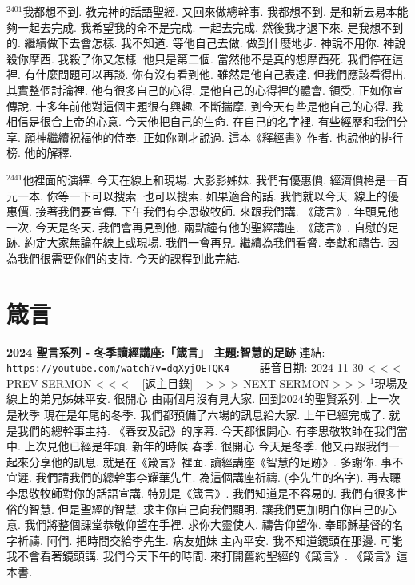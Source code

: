 \documentclass{book}
\begin{document}
$^{2401}$我都想不到.
教完神的話語聖經.
又回來做總幹事.
我都想不到.
是和新去易本能夠一起去完成.
我希望我的命不是完成.
一起去完成.
然後我才退下來.
是我想不到的.
繼續做下去會怎樣.
我不知道.
等他自己去做.
做到什麼地步.
神說不用你.
神說殺你摩西.
我殺了你又怎樣.
他只是第二個.
當然他不是真的想摩西死.
我們停在這裡.
有什麼問題可以再談.
你有沒有看到他.
雖然是他自己表達.
但我們應該看得出.
其實整個討論裡.
他有很多自己的心得.
是他自己的心得裡的體會.
領受.
正如你宣傳說.
十多年前他對這個主題很有興趣.
不斷揣摩.
到今天有些是他自己的心得.
我相信是很合上帝的心意.
今天他把自己的生命.
在自己的名字裡.
有些經歷和我們分享.
願神繼續祝福他的侍奉.
正如你剛才說過.
這本《釋經書》作者.
也說他的排行榜.
他的解釋.

$^{2441}$他裡面的演繹.
今天在線上和現場.
大影影姊妹.
我們有優惠價.
經濟價格是一百元一本.
你等一下可以搜索.
也可以搜索.
如果適合的話.
我們就以今天.
線上的優惠價.
接著我們要宣傳.
下午我們有李思敬牧師.
來跟我們講.
《箴言》.
年頭見他一次.
今天是冬天.
我們會再見到他.
兩點鐘有他的聖經講座.
《箴言》.
自慰的足跡.
約定大家無論在線上或現場.
我們一會再見.
繼續為我們看脅.
奉獻和禱告.
因為我們很需要你們的支持.
今天的課程到此完結.
\newpage



\section{箴言}
\label{sec:dqXyjOETQK4}
\textbf{2024 聖言系列 - 冬季讀經講座:「箴言」 主題:智慧的足跡}
\newline
\newline
連結: \href{https://youtube.com/watch?v=dqXyjOETQK4}{\texttt{https://youtube.com/watch?v=dqXyjOETQK4}} ~~~~ 語音日期: 2024-11-30
\newline
\newline
\hyperref[sec:m4SkjH3Fp_4]{\small{< < < PREV SERMON < < <}}
~
\hyperref[sec:index]{\small{[返主目錄]}}
~
\hyperref[sec:EZL_OCl_lJE]{\small{> > > NEXT SERMON > > >}}
\newline
\newline
$^{1}$現場及線上的弟兄姊妹平安.
很開心 由兩個月沒有見大家.
回到2024的聖賢系列.
上一次是秋季 現在是年尾的冬季.
我們都預備了六場的訊息給大家.
上午已經完成了.
就是我們的總幹事主持.
《春安及記》的序幕.
今天都很開心.
有李思敬牧師在我們當中.
上次見他已經是年頭.
新年的時候 春季.
很開心 今天是冬季.
他又再跟我們一起來分享他的訊息.
就是在《箴言》裡面.
讀經講座《智慧的足跡》.
多謝你.
事不宜遲.
我們請我們的總幹事李耀華先生.
為這個講座祈禱.
(李先生的名字).
再去聽李思敬牧師對你的話語宣講.
特別是《箴言》.
我們知道是不容易的.
我們有很多世俗的智慧.
但是聖經的智慧.
求主你自己向我們顯明.
讓我們更加明白你自己的心意.
我們將整個課堂恭敬仰望在手裡.
求你大靈使人.
禱告仰望你.
奉耶穌基督的名字祈禱.
阿們.
把時間交給李先生.
病友姐妹 主內平安.
我不知道鏡頭在那邊.
可能我不會看著鏡頭講.
我們今天下午的時間.
來打開舊約聖經的《箴言》.
《箴言》這本書.
\end{document}
